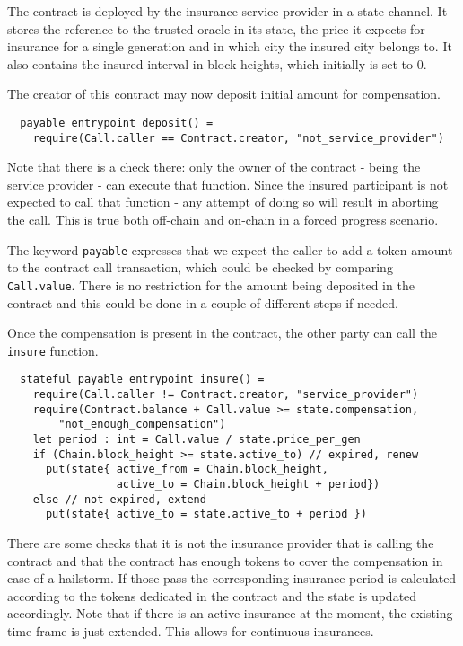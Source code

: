 The contract is deployed by the insurance service provider in a state channel.
It stores the reference to the trusted oracle in its state, the price it
expects for insurance for a single generation and in which city the insured
city belongs to. It also contains the insured interval in block heights, which
initially is set to 0.

The creator of this contract may now deposit initial amount for compensation.

\begin{verbatim}
  payable entrypoint deposit() =
    require(Call.caller == Contract.creator, "not_service_provider")
\end{verbatim}

Note that there is a check there: only the owner of the contract - being the
service provider - can execute that function. Since the insured participant is
not expected to call that function - any attempt of doing so will result in
aborting the call. This is true both off-chain and on-chain in a forced
progress scenario.

The keyword \verb+payable+ expresses that we expect the caller to add a token
amount to the contract call transaction, which could be checked by comparing
\verb+Call.value+. There is no restriction for the amount being deposited in
the contract and this could be done in a couple of different steps if needed.

Once the compensation is present in the contract, the other party can
call the \verb+insure+ function.

\begin{verbatim}
  stateful payable entrypoint insure() =
    require(Call.caller != Contract.creator, "service_provider")
    require(Contract.balance + Call.value >= state.compensation, 
        "not_enough_compensation")
    let period : int = Call.value / state.price_per_gen
    if (Chain.block_height >= state.active_to) // expired, renew
      put(state{ active_from = Chain.block_height,
                 active_to = Chain.block_height + period})
    else // not expired, extend
      put(state{ active_to = state.active_to + period })
\end{verbatim}

There are some checks that it is not the insurance provider that is calling
the contract and that the contract has enough tokens to cover the compensation
in case of a hailstorm. If those pass the corresponding insurance period is
calculated according to the tokens dedicated in the contract and the state is
updated accordingly. Note that if there is an active insurance at the moment,
the existing time frame is just extended. This allows for continuous insurances.

